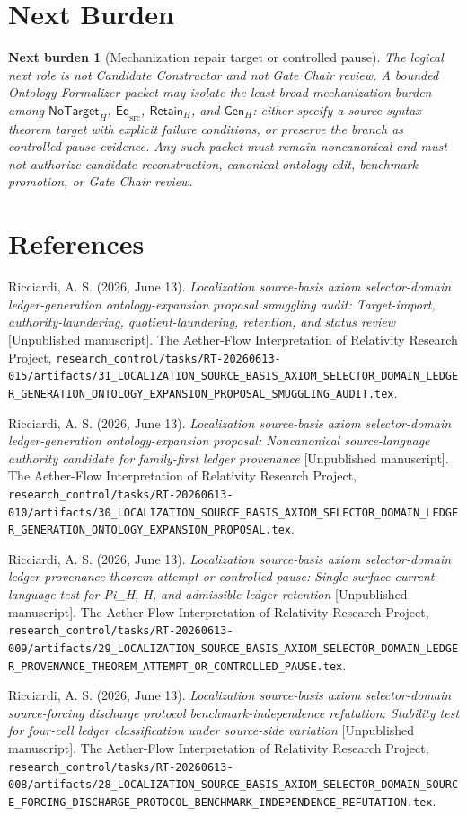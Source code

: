 \documentclass[11pt]{article}
\newcommand{\GenH}{\mathsf{Gen}_{H}}
\newcommand{\EqSrc}{\mathsf{Eq}_{\mathrm{src}}}
\newcommand{\RetainH}{\mathsf{Retain}_{H}}
\newcommand{\NoTargetH}{\mathsf{NoTarget}_{H}}
\newtheorem{nextburden}{Next burden}
\begin{document}
\section{Next Burden}

\begin{nextburden}[Mechanization repair target or controlled pause]
The logical next role is not Candidate Constructor and not Gate Chair
review. A bounded Ontology Formalizer packet may isolate the least broad
mechanization burden among \(\NoTargetH\), \(\EqSrc\), \(\RetainH\), and
\(\GenH\): either specify a source-syntax theorem target with explicit
failure conditions, or preserve the branch as controlled-pause evidence.
Any such packet must remain noncanonical and must not authorize candidate
reconstruction, canonical ontology edit, benchmark promotion, or Gate Chair
review.
\end{nextburden}

\section*{References}

Ricciardi, A. S. (2026, June 13). \emph{Localization source-basis axiom
selector-domain ledger-generation ontology-expansion proposal smuggling
audit: Target-import, authority-laundering, quotient-laundering, retention,
and status review} [Unpublished manuscript]. The Aether-Flow Interpretation
of Relativity Research Project,
\texttt{research\_control/tasks/RT-20260613-015/artifacts/31\_LOCALIZATION\_SOURCE\_BASIS\_AXIOM\_SELECTOR\_DOMAIN\_LEDGER\_GENERATION\_ONTOLOGY\_EXPANSION\_PROPOSAL\_SMUGGLING\_AUDIT.tex}.

Ricciardi, A. S. (2026, June 13). \emph{Localization source-basis axiom
selector-domain ledger-generation ontology-expansion proposal: Noncanonical
source-language authority candidate for family-first ledger provenance}
[Unpublished manuscript]. The Aether-Flow Interpretation of Relativity
Research Project,
\texttt{research\_control/tasks/RT-20260613-010/artifacts/30\_LOCALIZATION\_SOURCE\_BASIS\_AXIOM\_SELECTOR\_DOMAIN\_LEDGER\_GENERATION\_ONTOLOGY\_EXPANSION\_PROPOSAL.tex}.

Ricciardi, A. S. (2026, June 13). \emph{Localization source-basis axiom
selector-domain ledger-provenance theorem attempt or controlled pause:
Single-surface current-language test for Pi\_H, H, and admissible ledger
retention} [Unpublished manuscript]. The Aether-Flow Interpretation of
Relativity Research Project,
\texttt{research\_control/tasks/RT-20260613-009/artifacts/29\_LOCALIZATION\_SOURCE\_BASIS\_AXIOM\_SELECTOR\_DOMAIN\_LEDGER\_PROVENANCE\_THEOREM\_ATTEMPT\_OR\_CONTROLLED\_PAUSE.tex}.

Ricciardi, A. S. (2026, June 13). \emph{Localization source-basis axiom
selector-domain source-forcing discharge protocol benchmark-independence
refutation: Stability test for four-cell ledger classification under
source-side variation} [Unpublished manuscript]. The Aether-Flow
Interpretation of Relativity Research Project,
\texttt{research\_control/tasks/RT-20260613-008/artifacts/28\_LOCALIZATION\_SOURCE\_BASIS\_AXIOM\_SELECTOR\_DOMAIN\_SOURCE\_FORCING\_DISCHARGE\_PROTOCOL\_BENCHMARK\_INDEPENDENCE\_REFUTATION.tex}.
\end{document}
